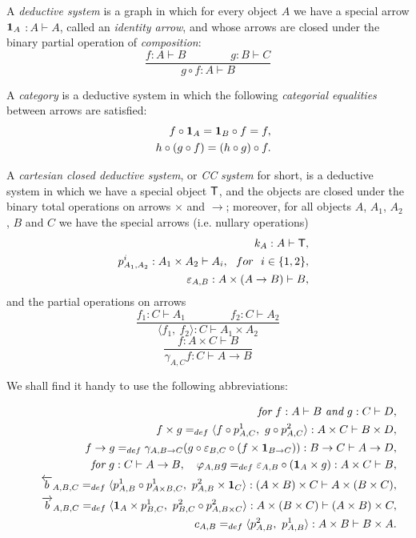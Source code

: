A {\it deductive system} is a graph in which for every object $A$ we have a
special arrow ${\bf 1}_{A}$ $:A\vdash A$, called an {\it identity arrow},
and whose arrows are closed under the binary partial operation of {\it %
composition}: 
\[
\frac{f:A\vdash B\qquad \qquad g:B\vdash C}{g\circ f:A\vdash B} 
\]

A {\it category} is a deductive system in which the following {\it %
categorial equalities} between arrows are satisfied: 
\begin{eqnarray*}
&&f\circ {\bf 1}_{A}={\bf 1}_{B}\circ f=f, \\
&&h\circ (g\circ f)=(h\circ g)\circ f.
\end{eqnarray*}

A {\it cartesian closed deductive system}, or {\it CC} {\it system} for
short, is a deductive system in which we have a special object ${\sf T}$,
and the objects are closed under the binary total operations on arrows $%
\times $ and $\rightarrow $; moreover, for all objects $A$, $A_{1}$, $A_{2}$%
, $B$ and $C$ we have the special arrows (i.e. nullary operations) 
\begin{eqnarray*}
&&k_{A}:A\vdash {\sf T}, \\
&&p_{A_{1},A_{2}}^{i}:A_{1}\times A_{2}\vdash A_{i},~~for~~i\in \{1,2\}, \\
&&\varepsilon _{A,B}:A\times (A\rightarrow B)\vdash B,
\end{eqnarray*}
and the partial operations on arrows 
\[
\frac{f_{1}:C\vdash A_{1}\qquad \qquad f_{2}:C\vdash A_{2}}{\langle
f_{1},~f_{2}\rangle :C\vdash A_{1}\times A_{2}} 
\]
\[
\frac{f:A\times C\vdash B}{\gamma _{A,C}f:C\vdash A\rightarrow B} 
\]

We shall find it handy to use the following abbreviations:

\begin{eqnarray*}
&&\text{{\it for}}{\it ~}f:A\vdash B{\it ~}\text{{\it and}}{\it ~}g:C\vdash
D, \\
&&\quad f\times g=_{def}\langle f\circ p_{A,C}^{1},~g\circ
p_{A,C}^{2}\rangle :A\times C\vdash B\times D, \\
&&\quad f\rightarrow g=_{def}\gamma _{A,B\rightarrow C}(g\circ \varepsilon
_{B,C}\circ (f\times {\bf 1}_{B\rightarrow C})):B\rightarrow C\vdash
A\rightarrow D,\bigskip \\
&&\text{{\it for}}{\it ~}g:C\vdash A\rightarrow B,\quad \varphi
_{A,B}g=_{def}\varepsilon _{A,B}\circ ({\bf 1}_{A}\times g):A\times C\vdash
B,\bigskip \\
&&\quad \overleftarrow{b}_{A,B,C}=_{def}\langle p_{A,B}^{1}\circ p_{A\times
B,C}^{1},~p_{A,B}^{2}\times {\bf 1}_{C}\rangle :(A\times B)\times C\vdash
A\times (B\times C), \\
&&\quad \overrightarrow{b}_{A,B,C}=_{def}\langle {\bf 1}_{A}\times
p_{B,C}^{1},~p_{B,C}^{2}\circ p_{A,B\times C}^{2}\rangle :A\times (B\times
C)\vdash (A\times B)\times C, \\
&&\quad c_{A,B}=_{def}\langle p_{A,B}^{2},~p_{A,B}^{1}\rangle :A\times
B\vdash B\times A.
\end{eqnarray*}

